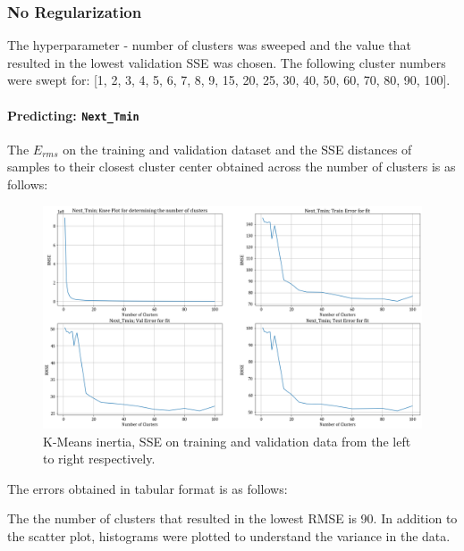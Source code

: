 \documentclass[12pt,a4paper]{article}
\newcommand{\noi}{\noindent}
\def\tt#1{\texttt{#1}}
\begin{document}
\subsubsection{No Regularization}
The hyperparameter - number of clusters was sweeped and the value that resulted in the lowest validation SSE was chosen. The following cluster numbers were swept for: [1, 2, 3, 4, 5, 6, 7, 8, 9, 15, 20, 25, 30, 40, 50, 60, 70, 80, 90, 100].

\paragraph{Predicting: \tt{Next\_Tmin}}
The $E_{rms}$ on the training and validation dataset and the SSE distances of samples to their closest cluster center obtained across the number of clusters is as follows:
\begin{figure}[H]
     \centering
     \includegraphics[scale=0.4]{images/t3_d3/no_reg/tmin_errors.png}
     \caption{K-Means inertia, SSE on training and validation data from the left to right respectively.}
\end{figure}

\vspace{-1em}
\noi
The errors obtained in tabular format is as follows:


\noi
The the number of clusters that resulted in the lowest RMSE is 90. In addition to the scatter plot, histograms were plotted to understand the variance in the data.\\
\end{document}
